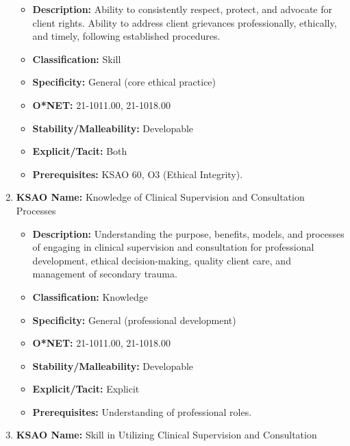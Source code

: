 \documentclass[
  letterpaper,
  DIV=11,
  numbers=noendperiod]{scrartcl}
\providecommand{\tightlist}{%
  \setlength{\itemsep}{0pt}\setlength{\parskip}{0pt}}
\begin{document}
\begin{enumerate}
  \begin{itemize}
  \tightlist
  \item
    \textbf{Description:} Ability to consistently respect, protect, and
    advocate for client rights. Ability to address client grievances
    professionally, ethically, and timely, following established
    procedures.
  \item
    \textbf{Classification:} Skill
  \item
    \textbf{Specificity:} General (core ethical practice)
  \item
    \textbf{O*NET:} 21-1011.00, 21-1018.00
  \item
    \textbf{Stability/Malleability:} Developable
  \item
    \textbf{Explicit/Tacit:} Both
  \item
    \textbf{Prerequisites:} KSAO 60, O3 (Ethical Integrity).
  \end{itemize}
\item
  \textbf{KSAO Name:} Knowledge of Clinical Supervision and Consultation
  Processes

  \begin{itemize}
  \tightlist
  \item
    \textbf{Description:} Understanding the purpose, benefits, models,
    and processes of engaging in clinical supervision and consultation
    for professional development, ethical decision-making, quality
    client care, and management of secondary trauma.
  \item
    \textbf{Classification:} Knowledge
  \item
    \textbf{Specificity:} General (professional development)
  \item
    \textbf{O*NET:} 21-1011.00, 21-1018.00
  \item
    \textbf{Stability/Malleability:} Developable
  \item
    \textbf{Explicit/Tacit:} Explicit
  \item
    \textbf{Prerequisites:} Understanding of professional roles.
  \end{itemize}
\item
  \textbf{KSAO Name:} Skill in Utilizing Clinical Supervision and
  Consultation


\end{enumerate}
\end{document}
